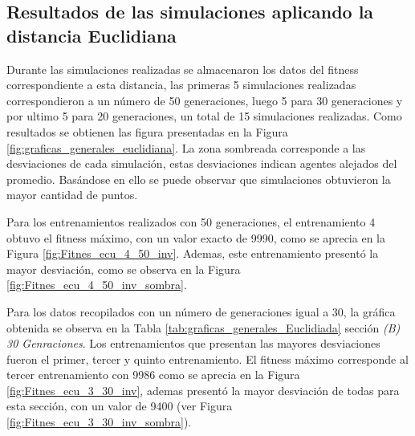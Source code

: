 \documentclass[conference]{IEEEtran}
\begin{document}
\subsection{Resultados de las simulaciones aplicando la distancia Euclidiana}
Durante las simulaciones realizadas se almacenaron los datos del fitness correspondiente a esta distancia, las primeras 5 simulaciones realizadas correspondieron a un número de 50 generaciones, luego 5 para 30 generaciones y por ultimo 5 para 20 generaciones, un total de 15 simulaciones realizadas. Como resultados se obtienen las figura presentadas en la Figura \ref{fig:graficas_generales_euclidiana}. La zona sombreada corresponde a las desviaciones de cada simulación, estas desviaciones indican agentes alejados del promedio. Basándose en ello se puede observar que simulaciones obtuvieron la mayor cantidad de puntos.

Para los entrenamientos realizados con 50 generaciones, el entrenamiento 4 obtuvo el fitness máximo, con un valor exacto de 9990, como se aprecia en la Figura \ref{fig:Fitnes_ecu_4_50_inv}. Ademas, este entrenamiento presentó la mayor desviación, como se observa en la Figura \ref{fig:Fitnes_ecu_4_50_inv_sombra}.



Para los datos recopilados con un número de generaciones igual a 30, la gráfica obtenida se observa en la Tabla \ref{tab:graficas_generales_Euclidiada} sección \textit{(B) 30 Genraciones}. Los entrenamientos que presentan las mayores desviaciones fueron el primer, tercer y quinto entrenamiento. El fitness máximo corresponde al tercer entrenamiento con 9986 como se aprecia en la Figura \ref{fig:Fitnes_ecu_3_30_inv}, ademas presentó la mayor desviación de todas para esta sección, con un valor de 9400 (ver Figura \ref{fig:Fitnes_ecu_3_30_inv_sombra}).
\end{document}
